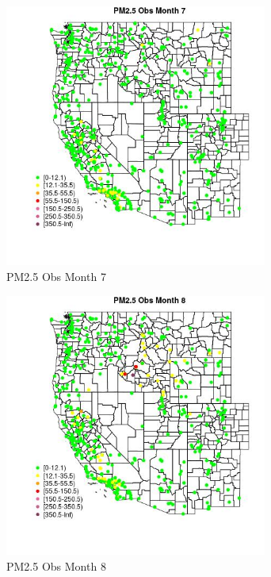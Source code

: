 \begin{figure} 
\centering  
\includegraphics[width=0.77\textwidth]{Code_Outputs/Report_ML_input_PM25_Step4_part_e_de_duplicated_aves_compiled_2019-05-14wNAs_MapObsMo7PM25_Obs.jpg} 
\caption{\label{fig:Report_ML_input_PM25_Step4_part_e_de_duplicated_aves_compiled_2019-05-14wNAsMapObsMo7PM25_Obs}PM2.5 Obs Month 7} 
\end{figure} 
 

\begin{figure} 
\centering  
\includegraphics[width=0.77\textwidth]{Code_Outputs/Report_ML_input_PM25_Step4_part_e_de_duplicated_aves_compiled_2019-05-14wNAs_MapObsMo8PM25_Obs.jpg} 
\caption{\label{fig:Report_ML_input_PM25_Step4_part_e_de_duplicated_aves_compiled_2019-05-14wNAsMapObsMo8PM25_Obs}PM2.5 Obs Month 8} 
\end{figure} 
 

